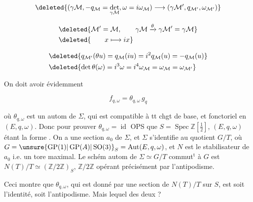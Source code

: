 
\[
\deleted{(\gamma\mathcal M,-q_{\mathcal M}=\det_{\gamma\mathcal M},\omega=i\omega_{\mathcal M})\longrightarrow(\gamma\mathcal M',q_{\mathcal M'},\omega_{\mathcal M'})}
\]


\[
\begin{aligned}&\deleted{\mathcal M'=\mathcal M,\qquad\gamma\mathcal M\xrightarrow{\theta}\gamma\mathcal M'=\gamma\mathcal M}\\&\deleted{\qquad x\longmapsto ix}\end{aligned}
\]


\[
\begin{aligned}&\deleted{q_{\mathcal M'}(\theta u)=q_{\mathcal M}(iu)=i^2q_{\mathcal M}(u)=-q_{\mathcal M}(u)}\\&\deleted{\det\theta(\omega)=i^3\omega=i^4\omega_{\mathcal M}=\omega_{\mathcal M}=\omega_{\mathcal M'}}\end{aligned}
\]




On doit avoir évidemment

\[
f_{q,\omega}=\theta_{q,\omega}\,g_q
\]

où $\theta_{q,\omega}$ est un autom de $\Sigma$, qui est compatible à tt chgt de base, et fonctoriel en $(E,q,\omega)$. Donc pour prouver $\theta_{q,\omega}=\operatorname{id}$ OPS que $S=\operatorname{Spec}\mathbb Z[\frac12]$, $(E,q,\omega)$ étant la forme . On a une section $a_0$ de $\Sigma$, et $\Sigma$ s'identifie au quotient $G/T$, où $G={\unsure{\operatorname{GP}(1)|\operatorname{GP}(A)|\operatorname{SO}(3)}}_S=\operatorname{Aut}(E,q,\omega)$, et $N$ est le stabilisateur de $a_0$ i.e. un tore maximal. Le schém  autom de $\Sigma\simeq G/T$ commut$^{\mathrm t}$ à $G$ est $N(T)/T\simeq(\mathbb Z/2\mathbb Z)_S$, $\mathbb Z/2\mathbb Z$ opérant précisément par l'antipodisme.

Ceci montre que $\theta_{q,\omega}$, qui est donné par une section de $N(T)/T$ sur $S$, est soit l'identité, soit l'antipodisme. Mais lequel des deux ?

